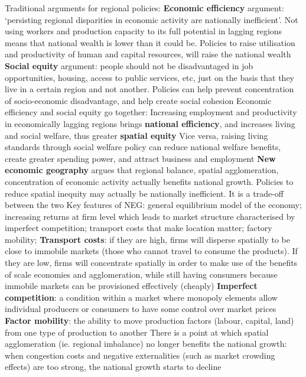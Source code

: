 \documentclass{article}
\begin{document}
\begin{outline}
	\1 Traditional arguments for regional policies: 
		\2 \textbf{Economic efficiency} argument: `persisting regional disparities in economic activity are nationally inefficient'. Not using workers and production capacity to its full potential in lagging regions means that national wealth is lower than it could be. Policies to raise utilisation and productivity of human and capital resources, will raise the national wealth
		\2 \textbf{Social equity} argument: people should not be disadvantaged in job opportunities, housing, access to public services, etc, just on the basis that they live in a certain region and not another. Policies can help prevent concentration of socio-economic disadvantage, and help create social cohesion
		\2 Economic efficiency and social equity go together: 
			\3 Increasing employment and productivity in economically lagging regions brings \textbf{national efficiency}, and increases living and social welfare, thus greater \textbf{spatial equity}
			\3 Vice versa, raising living standards through social welfare policy can reduce national welfare benefits, create greater spending power, and attract business and employment
	\1 \textbf{New economic geography} argues that regional balance, spatial agglomeration, concentration of economic activity actually benefits national growth. Policies to reduce spatial inequity may actually be nationally inefficient. It is a trade-off between the two
		\2 Key features of NEG: general equilibrium model of the economy; increasing returns at firm level which leads to market structure characterised by imperfect competition; transport costs that make location matter; factory mobility; 
			\3 \textbf{Transport costs}: if they are high, firms will disperse spatially to be close to immobile markets (those who cannot travel to consume the products). If they are low, firms will concentrate spatially in order to make use of the benefits of scale economies and agglomeration, while still having consumers because immobile markets can be provisioned effectively (cheaply)
			\3 \textbf{Imperfect competition}: a condition within a market where monopoly elements allow individual producers or consumers to have some control over market prices
			\3 \textbf{Factor mobility}: the ability to move production factors (labour, capital, land) from one type of production to another
		\2 There is a point at which spatial agglomeration (ie. regional imbalance) no longer benefits the national growth: when congestion costs and negative externalities (such as market crowding effects) are too strong, the national growth starts to decline
				
\end{outline}
\end{document}
